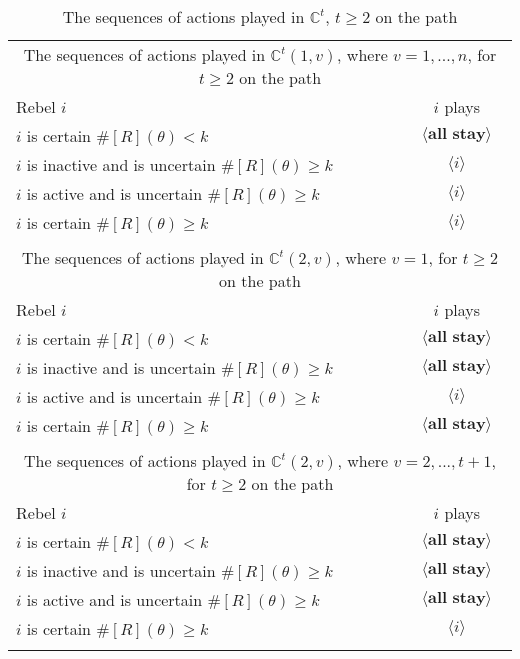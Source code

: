 \documentclass[12pt,letter]{article}
\newcommand{\Kappa}{\mathbb{C}}
\theoremstyle{definition}
\theoremstyle{remark}
\theoremstyle{claim}
\begin{document}
\begin{table}[!htbp]
\caption{The sequences of actions played in $\Kappa^t$, $t\geq 2$ on the path}
\label{Table_cdt}
\begin{center}
\begin{tabular}{l c}
\multicolumn{2}{c}{The sequences of actions played in $\Kappa^t(1,v)$, where $v=1,...,n$, for $t\geq 2$ on the path}\\
Rebel $i$ 	 	&  	$i$ plays		 \\
\hline
\hline
$i$ is certain $\#[R](\theta)<k$ 	& 	$\langle \textbf{all stay} \rangle$	\\
$i$ is inactive and is uncertain $\#[R](\theta)\geq k$	& 	$\langle i \rangle$	\\
$i$ is active and is uncertain $\#[R](\theta)\geq k$ &  $\langle i \rangle$  \\
$i$ is certain $\#[R](\theta)\geq k$ &  $\langle i \rangle$  \\
\hline
\\
\multicolumn{2}{c}{The sequences of actions played in $\Kappa^t(2,v)$, where $v=1$, for $t\geq 2$ on the path}\\
Rebel $i$ 	 	&  	$i$ plays		 \\
\hline
\hline
$i$ is certain $\#[R](\theta)<k$ 	& 	$\langle \textbf{all stay} \rangle$	\\
$i$ is inactive and is uncertain $\#[R](\theta)\geq k$	& 	$\langle \textbf{all stay} \rangle$	\\
$i$ is active and is uncertain $\#[R](\theta)\geq k$ &  $\langle i \rangle$  \\
$i$ is certain $\#[R](\theta)\geq k$ &  $\langle \textbf{all stay} \rangle$  \\
\hline
\\
\multicolumn{2}{c}{The sequences of actions played in $\Kappa^t(2,v)$, where $v=2,...,t+1$, for $t\geq 2$ on the path}\\
Rebel $i$ 	 	&  	$i$ plays		 \\
\hline
\hline
$i$ is certain $\#[R](\theta)<k$ 	& 	$\langle \textbf{all stay} \rangle$	\\
$i$ is inactive and is uncertain $\#[R](\theta)\geq k$	& 	$\langle \textbf{all stay} \rangle$	\\
$i$ is active and is uncertain $\#[R](\theta)\geq k$ &  $\langle \textbf{all stay} \rangle$  \\
$i$ is certain $\#[R](\theta)\geq k$ &  $\langle i \rangle$  \\
\hline
\\

\end{tabular}
\end{center}
\end{table}
\end{document}
